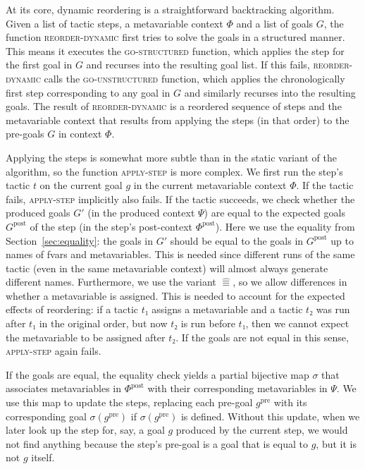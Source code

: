 \documentclass[sigplan,10pt,anonymous,review]{acmart}
\newcommand{\pre}{\mathrm{pre}}
\newcommand{\post}{\mathrm{post}}
\newcommand{\aeq}{\mathrel{\hat{≡}}}
\begin{document}
At its core, dynamic reordering is a straightforward backtracking algorithm.
Given a list of tactic steps, a metavariable context $Φ$ and a list of goals $G$, the function \textsc{reorder-dynamic} first tries to solve the goals in a structured manner.
This means it executes the \textsc{go-structured} function, which applies the step for the first goal in $G$ and recurses into the resulting goal list.
If this fails, \textsc{reorder-dynamic} calls the \textsc{go-unstructured} function, which applies the chronologically first step corresponding to any goal in $G$ and similarly recurses into the resulting goals.
The result of \textsc{reorder-dynamic} is a reordered sequence of steps and the metavariable context that results from applying the steps (in that order) to the pre-goals $G$ in context $Φ$.

Applying the steps is somewhat more subtle than in the static variant of the algorithm, so the function \textsc{apply-step} is more complex.
We first run the step's tactic $t$ on the current goal $g$ in the current metavariable context $Φ$.
If the tactic fails, \textsc{apply-step} implicitly also fails.
If the tactic succeeds, we check whether the produced goals $G'$ (in the produced context $Ψ$) are equal to the expected goals $G^{\post}$ of the step (in the step's post-context $Φ^{\post}$).
Here we use the equality from Section~\ref{sec:equality}: the goals in $G'$ should be equal to the goals in $G^{\post}$ up to names of fvars and metavariables.
This is needed since different runs of the same tactic (even in the same metavariable context) will almost always generate different names.
Furthermore, we use the variant $\aeq$, so we allow differences in whether a metavariable is assigned.
This is needed to account for the expected effects of reordering: if a tactic $t₁$ assigns a metavariable and a tactic $t₂$ was run after $t₁$ in the original order, but now $t₂$ is run before $t₁$, then we cannot expect the metavariable to be assigned after $t₂$.
If the goals are not equal in this sense, \textsc{apply-step} again fails.

If the goals are equal, the equality check yields a partial bijective map $σ$ that associates metavariables in $Φ^{\post}$ with their corresponding metavariables in $Ψ$.
We use this map to update the steps, replacing each pre-goal $g^{\pre}$ with its corresponding goal $σ(g^{\pre})$ if $σ(g^{\pre})$ is defined.
Without this update, when we later look up the step for, say, a goal $g$ produced by the current step, we would not find anything because the step's pre-goal is a goal that is equal to $g$, but it is not $g$ itself.
\end{document}
